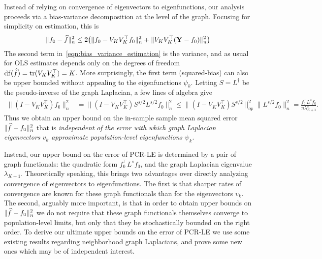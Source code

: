 Instead of relying on convergence of eigenvectors to eigenfunctions, our analysis proceeds via a bias-variance decomposition at the level of the graph. Focusing for simplicity on estimation, this is 
\begin{equation}
\label{eqn:bias_variance_estimation}
\|f_0 - \widehat{f}\|_n^2 \leq 2\bigl(\|f_0 - V_KV_K^{\top}f_0\|_n^2 + \|V_KV_K^{\top}({\bf Y} - f_0)\|_n^2\bigr) 
\end{equation}
The second term in~\eqref{eqn:bias_variance_estimation} is the variance, and as usual for OLS estimates depends only on the degrees of freedom $\mathrm{df}(\widehat{f}) = \mathrm{tr}(V_KV_K^{\top}) = K$. More surprisingly, the first term (squared-bias) can also be upper bounded without appealing to the eigenfunctions $\psi_k$. Letting $S = L^{\dagger}$ be the pseudo-inverse of the graph Laplacian, a few lines of algebra give
\begin{equation}
\label{eqn:bias_estimation}
\begin{aligned}
\|(I - V_KV_K^{\top})f_0\|_n^2 & = \|(I - V_KV_K^{\top})S^{s/2}L^{s/2}f_0\|_n^2 \leq \|(I - V_KV_K^{\top})S^{s/2}\|_{op}^2 \|L^{s/2}f_0\|_n^2 = \frac{f_0^{\top} L^s f_0}{n \lambda_{K + 1}^{s}}.
\end{aligned}
\end{equation}
Thus we obtain an upper bound on the in-sample sample mean squared error $\|\widehat{f} - f_0\|_n^2$ that is \emph{independent of the error with which graph Laplacian eigenvectors $v_k$ approximate population-level eigenfunctions $\psi_k$}. 

Instead, our upper bound on the error of PCR-LE is determined by a pair of graph functionals: the quadratic form $f_0^{\top}L^s f_0$, and the graph Laplacian eigenvalue $\lambda_{K + 1}$. Theoretically speaking, this brings two advantages over directly analyzing convergence of eigenvectors to eigenfunctions. The first is that sharper rates  of convergence are known for these graph functionals than for the eigenvectors $v_k$. The second, arguably more important, is that in order to obtain upper bounds on $\|\widehat{f} - f_0\|_n^2$ we do not require that these graph functionals themselves converge to population-level limits, but only that they be stochastically bounded on the right order. To derive our ultimate upper bounds on the error of PCR-LE we use some existing results regarding neighborhood graph Laplacians, and prove some new ones which may be of independent interest. 

